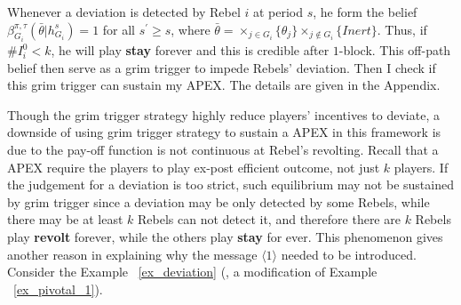 \documentclass[12pt,letter]{article}
\theoremstyle{definition}
\theoremstyle{remark}
\theoremstyle{claim}
\begin{document}
Whenever a deviation is detected by Rebel $i$ at period $s$, he form the belief $\beta^{\pi,\tau}_{G_i}(\bar{\theta}|h^{s}_{G_i})=1$ for all $s^{'}\geq s$, where $\bar{\theta}=\times_{j\in G_i}\{\theta_j\}\times_{j\notin G_i}\{Inert\}$. Thus, if $\# I^0_i<k$, he will play \textbf{stay} forever and this is credible after $1$-block. This off-path belief then serve as a grim trigger to impede Rebels' deviation. Then I check if this grim trigger can sustain my APEX. The details are given in the Appendix.

Though the grim trigger strategy highly reduce players' incentives to deviate, a downside of using grim trigger strategy to sustain a APEX in this framework is due to the pay-off function is not continuous at Rebel's revolting. Recall that a APEX require  the players to play ex-post efficient outcome, not just $k$ players. If the judgement for a deviation is too strict, such equilibrium may not be sustained by grim trigger since a deviation may be only detected by some Rebels, while there may be at least $k$ Rebels can not detect it, and therefore there are $k$ Rebels play \textbf{revolt} forever, while the others play \textbf{stay} for ever. This phenomenon gives another reason in explaining why the message $\langle 1 \rangle$ needed to be introduced. Consider the Example ~\ref{ex_deviation} (, a modification of Example ~\ref{ex_pivotal_1}).
\end{document}
